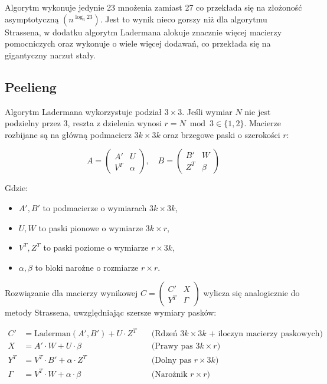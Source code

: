 \documentclass[twoside]{article}
\begin{document}
Algorytm wykonuje jedynie 23 mnożenia zamiast 27 co przekłada się na złożoność asymptotyczną $(n^{\log_{3}23})$. Jest to wynik nieco gorszy niż dla algorytmu
Strassena, w dodatku algorytm Ladermana alokuje znacznie więcej macierzy pomocniczych oraz wykonuje o wiele więcej dodawań, co przekłada się na gigantyczny
narzut stały.

\subsection{Peelieng}

Algorytm Ladermana wykorzystuje podział $3 \times 3$. Jeśli wymiar $N$ nie jest podzielny przez 3, reszta z dzielenia wynosi $r = N \bmod 3 \in \{1, 2\}$.
Macierze rozbijane są na główną podmacierz $3k \times 3k$ oraz brzegowe paski o szerokości $r$:

\begin{equation}
A = \begin{pmatrix} A' & U \\ V^T & \alpha \end{pmatrix}, \quad 
B = \begin{pmatrix} B' & W \\ Z^T & \beta \end{pmatrix}
\end{equation}

Gdzie:
\begin{itemize}
    \item $A', B'$ to podmacierze o wymiarach $3k \times 3k$,
    \item $U, W$ to paski pionowe o wymiarze $3k \times r$,
    \item $V^T, Z^T$ to paski poziome o wymiarze $r \times 3k$,
    \item $\alpha, \beta$ to bloki narożne o rozmiarze $r \times r$.
\end{itemize}

Rozwiązanie dla macierzy wynikowej $C = \begin{pmatrix} C' & X \\ Y^T & \Gamma \end{pmatrix}$ wylicza się analogicznie do metody Strassena, uwzględniając szersze wymiary pasków:

\begin{align}
    C' &= \text{Laderman}(A', B') + U \cdot Z^T \quad &\text{(Rdzeń } 3k \times 3k \text{ + iloczyn macierzy paskowych)} \\
    X &= A' \cdot W + U \cdot \beta \quad &\text{(Prawy pas } 3k \times r \text{)} \\
    Y^T &= V^T \cdot B' + \alpha \cdot Z^T \quad &\text{(Dolny pas } r \times 3k \text{)} \\
    \Gamma &= V^T \cdot W + \alpha \cdot \beta \quad &\text{(Narożnik } r \times r \text{)}
\end{align}
\end{document}
